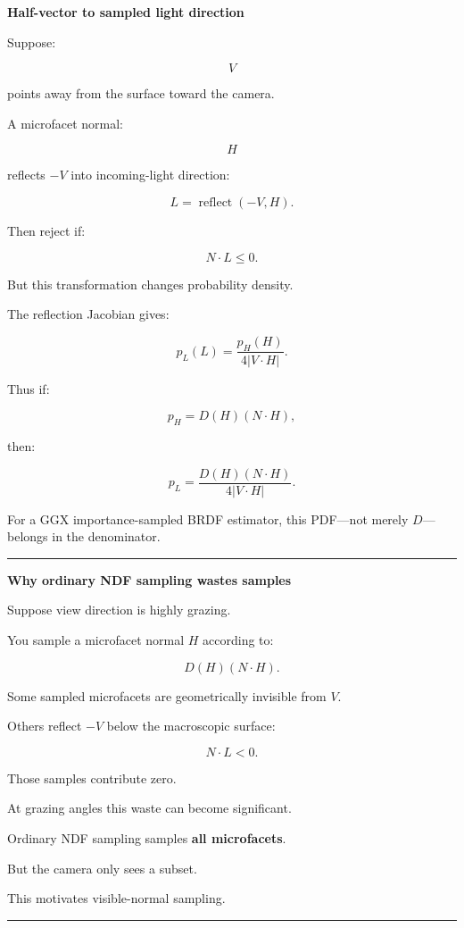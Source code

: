 \textbf{Half-vector to sampled light direction}

Suppose:

\[
V
\]

points away from the surface toward the camera.

A microfacet normal:

\[
H
\]

reflects \(-V\) into incoming-light direction:

\[
\boxed{
L=
\operatorname{reflect}(-V,H).
}
\]

Then reject if:

\[
N\cdot L\le0.
\]

But this transformation changes probability density.

The reflection Jacobian gives:

\[
\boxed{
p_L(L)
=
\frac{
p_H(H)
}{
4|V\cdot H|
}.
}
\]

Thus if:

\[
p_H=D(H)(N\cdot H),
\]

then:

\[
\boxed{
p_L
=
\frac{
D(H)(N\cdot H)
}{
4|V\cdot H|
}.
}
\]

For a GGX importance-sampled BRDF estimator, this PDF---not merely \(D\)---belongs in the denominator.

\begin{center}\rule{0.5\linewidth}{0.5pt}\end{center}

\textbf{Why ordinary NDF sampling wastes samples}

Suppose view direction is highly grazing.

You sample a microfacet normal \(H\) according to:

\[
D(H)(N\cdot H).
\]

Some sampled microfacets are geometrically invisible from \(V\).

Others reflect \(-V\) below the macroscopic surface:

\[
N\cdot L<0.
\]

Those samples contribute zero.

At grazing angles this waste can become significant.

Ordinary NDF sampling samples \textbf{all microfacets}.

But the camera only sees a subset.

This motivates visible-normal sampling.

\begin{center}\rule{0.5\linewidth}{0.5pt}\end{center}

